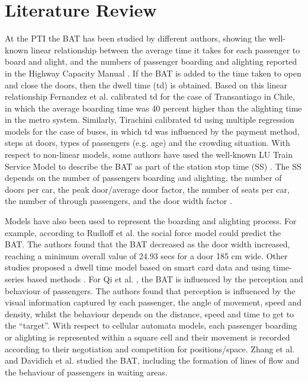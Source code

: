 \section{Literature Review}
\label{sec:2}

At the PTI the BAT has been studied by different authors, showing the well-known linear relationship between the average time it takes for each passenger to board and alight, and the numbers of passenger boarding and alighting reported in the Highway Capacity Manual \cite{Ref7}. If the BAT is added to the time taken to open and close the doors, then the dwell time (td) is obtained. Based on this linear relationship Fernandez et al. \cite{Ref8} calibrated td for the case of Transantiago in Chile, in which the average boarding time was 40 percent higher than the alighting time in the metro system. 
Similarly, Tirachini \cite{Ref9} calibrated td using multiple regression models for the case of buses, in which td was influenced by the payment method, steps at doors, types of passengers (e.g. age) and the crowding situation. With respect to non-linear models, some authors have used the well-known LU Train Service Model to describe the BAT as part of the station stop time (SS) \cite{Ref10,Ref11}. The SS depends on the number of passengers boarding and alighting, the number of doors per car, the peak door/average door factor, the number of seats per car, the number of through passengers, and the door width factor \cite{Ref12,Ref13}.

Models have also been used to represent the boarding and alighting process. For example, according to Rudloff et al. \cite{Ref14} the social force model could predict the BAT. The authors found that the BAT decreased as the door width increased, reaching a minimum overall value of 24.93 secs for a door 185 cm wide. Other studies proposed a dwell time model based on smart card data \cite{Ref15} and using time-series based methods \cite{Ref16}. For Qi et al. \cite{Ref17}, the BAT is influenced by the perception and behaviour of passengers. The authors found that perception is influenced by the visual information captured by each passenger, the angle of movement, speed and density, whilst the behaviour depends on the distance, speed and time to get to the “target”. With respect to cellular automata models, each passenger boarding or alighting is represented within a square cell and their movement is recorded according to their negotiation and competition for positions/space. Zhang et al. \cite{Ref18} and Davidich et al. \cite{Ref19} studied the BAT, including the formation of lines of flow and the behaviour of passengers in waiting areas.

